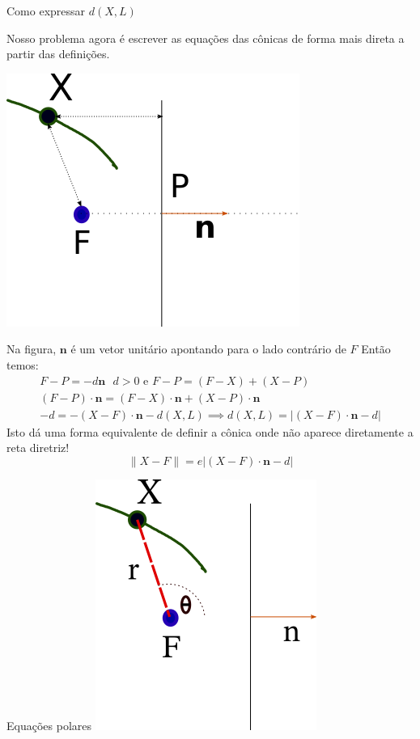\documentclass{beamer}
\begin{document}
\begin{frame}{Como expressar $d(X,L)$}
  
  Nosso problema agora é escrever as equações das cônicas de forma mais direta a partir das definições.
 
  \includegraphics{conica1.png}

\end{frame}

\begin{frame}
Na figura, $\mathbf{n}$ é um vetor unitário apontando para o lado contrário de $F$
Então temos:
\begin{gather*}
  F-P = -d\mathbf{n} \text{ } d>0 \text{ e } F-P = (F-X) + (X-P) \\
  (F-P)\cdot \mathbf{n}= (F-X)\cdot \mathbf{n} + (X-P)\cdot \mathbf{n}\\
  -d = -(X-F)\cdot\mathbf{n} -d(X,L) \implies d(X,L)=|(X-F)\cdot\mathbf{n}-d|
  \end{gather*}
  Isto dá uma forma equivalente de definir a cônica onde não aparece diretamente a reta 
  diretriz!
  $$\|X-F\| = e |(X-F)\cdot\mathbf{n}-d|$$
\end{frame}

    \begin{frame}{Equações polares }
     \includegraphics{conica2.png}
    \end{frame}
   
\end{document}
